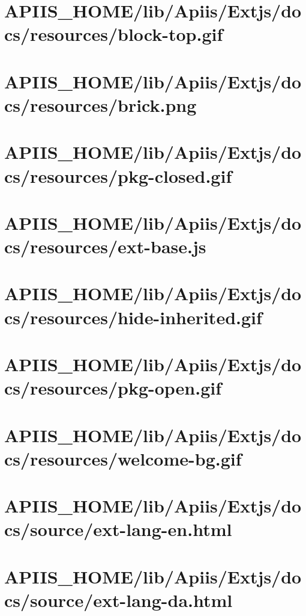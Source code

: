 \section{APIIS\_HOME/lib/Apiis/Extjs/docs/resources/block-top.gif} 
\section{APIIS\_HOME/lib/Apiis/Extjs/docs/resources/brick.png} 
\section{APIIS\_HOME/lib/Apiis/Extjs/docs/resources/pkg-closed.gif} 
\section{APIIS\_HOME/lib/Apiis/Extjs/docs/resources/ext-base.js} 
\section{APIIS\_HOME/lib/Apiis/Extjs/docs/resources/hide-inherited.gif} 
\section{APIIS\_HOME/lib/Apiis/Extjs/docs/resources/pkg-open.gif} 
\section{APIIS\_HOME/lib/Apiis/Extjs/docs/resources/welcome-bg.gif} 
\section{APIIS\_HOME/lib/Apiis/Extjs/docs/source/ext-lang-en.html} 
\section{APIIS\_HOME/lib/Apiis/Extjs/docs/source/ext-lang-da.html} 
